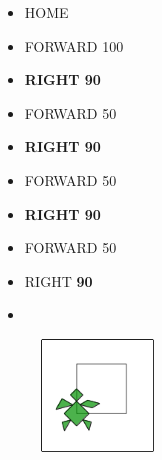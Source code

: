 \begin{scriptsize}
\begin{minipage}{0.45\textwidth}
\begin{itemize}[itemsep=-3pt,parsep=2pt]
\item[] \hspace{0.5cm} HOME 
\item[] \hspace{0.5cm} FORWARD 100
\item[] \hspace{0.5cm} \textbf{RIGHT 90}
\item[] \hspace{0.5cm} FORWARD 50
\item[] \hspace{0.5cm} \textbf{RIGHT 90}
\item[] \hspace{0.5cm} FORWARD 50
\item[] \hspace{0.5cm} \textbf{RIGHT 90}
\item[] \hspace{0.5cm} FORWARD 50
\item[] \hspace{0.5cm} RIGHT \textbf{90} 
\item[] \hspace{0.5cm} 
\end{itemize}
\end{minipage}
\end{scriptsize}
\begin{minipage}{0.5\textwidth}
\begin{figure}[H]
   \includegraphics[width=3.0cm,trim=4 4 8 4,clip]{./images/disegnare/disegnare-3.png}
   \label{dis-3}
\end{figure}
\end{minipage} \hfill

\vskip 1cm

